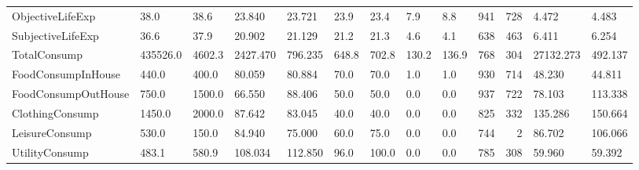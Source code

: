 \begin{table}
\begin{tabular}[t]{lllllllllrrll}
ObjectiveLifeExp & 38.0 & 38.6 & 23.840 & 23.721 & 23.9 & 23.4 & 7.9 & 8.8 & 941 & 728 & 4.472 & 4.483\\
SubjectiveLifeExp & 36.6 & 37.9 & 20.902 & 21.129 & 21.2 & 21.3 & 4.6 & 4.1 & 638 & 463 & 6.411 & 6.254\\
\addlinespace
TotalConsump & 435526.0 & 4602.3 & 2427.470 & 796.235 & 648.8 & 702.8 & 130.2 & 136.9 & 768 & 304 & 27132.273 & 492.137\\
FoodConsumpInHouse & 440.0 & 400.0 & 80.059 & 80.884 & 70.0 & 70.0 & 1.0 & 1.0 & 930 & 714 & 48.230 & 44.811\\
FoodConsumpOutHouse & 750.0 & 1500.0 & 66.550 & 88.406 & 50.0 & 50.0 & 0.0 & 0.0 & 937 & 722 & 78.103 & 113.338\\
ClothingConsump & 1450.0 & 2000.0 & 87.642 & 83.045 & 40.0 & 40.0 & 0.0 & 0.0 & 825 & 332 & 135.286 & 150.664\\
LeisureConsump & 530.0 & 150.0 & 84.940 & 75.000 & 60.0 & 75.0 & 0.0 & 0.0 & 744 & 2 & 86.702 & 106.066\\
\addlinespace
UtilityConsump & 483.1 & 580.9 & 108.034 & 112.850 & 96.0 & 100.0 & 0.0 & 0.0 & 785 & 308 & 59.960 & 59.392\\
\bottomrule
\end{tabular}
\end{table}
